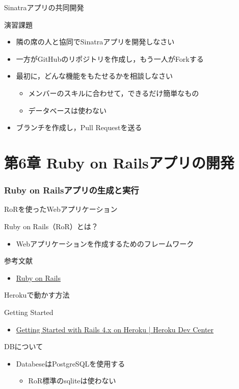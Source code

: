 \documentclass[t, aspectratio=169]{beamer}
\begin{document}
\begin{frame}[label=sec-5-3-2]{Sinatraアプリの共同開発}
\begin{block}{演習課題}
\begin{itemize}
\item 隣の席の人と協同でSinatraアプリを開発しなさい
\item 一方がGitHubのリポジトリを作成し，もう一人がForkする
\item 最初に，どんな機能をもたせるかを相談しなさい
\begin{itemize}
\item メンバーのスキルに合わせて，できるだけ簡単なもの
\item データベースは使わない
\end{itemize}
\item ブランチを作成し，Pull Requestを送る
\end{itemize}
\end{block}
\end{frame}
\part{第6章 Ruby on Railsアプリの開発}
\label{sec-6}
\section{Ruby on Railsアプリの生成と実行}
\label{sec-6-1}
\begin{frame}[label=sec-6-1-1]{RoRを使ったWebアプリケーション}
\begin{block}{Ruby on Rails（RoR）とは？}
\begin{itemize}
\item Webアプリケーションを作成するためのフレームワーク
\end{itemize}
\end{block}

\begin{block}{参考文献}
\begin{itemize}
\item \href{http://rubyonrails.org/}{Ruby on Rails}
\end{itemize}
\end{block}
\end{frame}
\begin{frame}[label=sec-6-1-2]{Herokuで動かす方法}
\begin{block}{Getting Started}
\begin{itemize}
\item \href{https://devcenter.heroku.com/articles/getting-started-with-rails4}{Getting Started with Rails 4.x on Heroku | Heroku Dev Center}
\end{itemize}
\end{block}
\begin{block}{DBについて}
\begin{itemize}
\item DatabeseはPostgreSQLを使用する
\begin{itemize}
\item RoR標準のsqliteは使わない
\end{itemize}
\end{itemize}
\end{block}
\end{frame}
\end{document}
